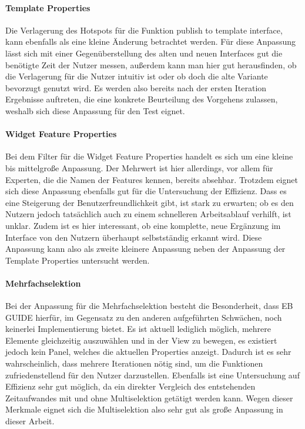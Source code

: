 \paragraph{Template Properties}
Die Verlagerung des Hotspots für die Funktion \glqq publish to template interface\grqq{}, kann ebenfalls als eine kleine Änderung betrachtet werden.
Für diese Anpassung lässt sich mit einer Gegenüberstellung des alten und neuen Interfaces gut die benötigte Zeit der Nutzer messen, außerdem kann man hier gut herausfinden, ob die Verlagerung für die Nutzer intuitiv ist oder ob doch die alte Variante bevorzugt genutzt wird.
Es werden also bereits nach der ersten Iteration Ergebnisse auftreten, die eine konkrete Beurteilung des Vorgehens zulassen, weshalb sich diese Anpassung für den Test eignet.

\paragraph{Widget Feature Properties}
Bei dem Filter für die Widget Feature Properties handelt es sich um eine kleine bis mittelgroße Anpassung.
Der Mehrwert ist hier allerdings, vor allem für Experten, die die Namen der Features kennen, bereits absehbar.
Trotzdem eignet sich diese Anpassung ebenfalls gut für die Untersuchung der Effizienz.
Dass es eine Steigerung der Benutzerfreundlichkeit gibt, ist stark zu erwarten; ob es den Nutzern jedoch tatsächlich auch zu einem schnelleren Arbeitsablauf verhilft, ist unklar.
Zudem ist es hier interessant, ob eine komplette, neue Ergänzung im Interface von den Nutzern überhaupt selbstständig erkannt wird.
Diese Anpassung kann also als zweite kleinere Anpassung neben der Anpassung der Template Properties untersucht werden.

\paragraph{Mehrfachselektion}
Bei der Anpassung für die Mehrfachselektion besteht die Besonderheit, dass EB GUIDE hierfür, im Gegensatz zu den anderen aufgeführten Schwächen, noch keinerlei Implementierung bietet.
Es ist aktuell lediglich möglich, mehrere Elemente gleichzeitig auszuwählen und in der View zu bewegen, es existiert jedoch kein Panel, welches die aktuellen Properties anzeigt.
Dadurch ist es sehr wahrscheinlich, dass mehrere Iterationen nötig sind, um die Funktionen zufriedenstellend für den Nutzer darzustellen.
Ebenfalls ist eine Untersuchung auf Effizienz sehr gut möglich, da ein direkter Vergleich des entstehenden Zeitaufwandes mit und ohne Multiselektion getätigt werden kann.
Wegen dieser Merkmale eignet sich die Multiselektion also sehr gut als große Anpassung in dieser Arbeit.

